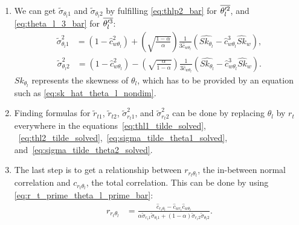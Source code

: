 \begin{enumerate}
    \item We can get $\tilde{\sigma}_{\theta_l 1}$ and $\tilde{\sigma}_{\theta_l 2}$ by fulfilling \cref{eq:thlp2_bar} for $\overline{\theta_l'^2}$,
    and \cref{eq:theta_l_3_bar} for $\overline{\theta_l'^3}$:
    \begin{align}
        \label{eq:sigma_tilde_theta1_solved}
        \tilde{\sigma}_{\theta_l 1}^2
        &= \left(1-\widehat{c}_{w \theta_l}^2 \right) +
        \left(\sqrt{\frac{1 - \alpha}{\alpha}}\right)
        \frac{1}{3 \widehat{c}_{w \theta_l}}
        \left( \widehat{Sk_{\theta_l}} - \widehat{c}_{w \theta_l}^3 \widehat{Sk}_w \right),
    \end{align}
    \begin{align}
        \label{eq:sigma_tilde_theta2_solved}
        \tilde{\sigma}_{\theta_l 2}^2
        &= \left(1 - \widehat{c}_{w \theta_l}^2 \right) -
        \left(\sqrt{\frac{\alpha}{1 - \alpha}}\right)
        \frac{1}{3 \widehat{c}_{w \theta_l}}
        \left( \widehat{Sk_{\theta_l}} - \widehat{c}_{w \theta_l}^3 \widehat{Sk}_w \right).
    \end{align}
    $Sk_{\theta_l}$ represents the skewness of $\theta_l$,
    which has to be provided by an equation such as \cref{eq:sk_hat_theta_l_nondim}.

    \item Finding formulas for $\tilde{r}_{t1}$, $\tilde{r}_{t2}$, $\tilde{\sigma}_{r_t 1}^2$,
    and $\tilde{\sigma}_{r_t 2}^2$ can be done by replacing $\theta_l$ by $r_t$ everywhere
    in the equations~\eqref{eq:thl1_tilde_solved},
    ~\eqref{eq:thl2_tilde_solved},~\eqref{eq:sigma_tilde_theta1_solved},
    and~\eqref{eq:sigma_tilde_theta2_solved}.

    \item The last step is to get a relationship between $r_{r_t \theta_l}$,
    the in-between normal correlation and $c_{r_t \theta_l}$,
    the total correlation.
    This can be done by using \cref{eq:r_t_prime_theta_l_prime_bar}:
    \begin{align}
        \label{eq:r_r_t_theta_l}
        r_{r_t \theta_l}
        &= \frac{\widehat{c}_{r_t \theta_l} - \widehat{c}_{w r_t} \widehat{c}_{w \theta_l}}
        {\alpha \tilde{\sigma}_{r_{t}1}\tilde{\sigma}_{\theta_{l}1} +
            (1-\alpha) \tilde{\sigma}_{r_{t}2} \tilde{\sigma}_{\theta_{l}2}}.
    \end{align}
\end{enumerate}